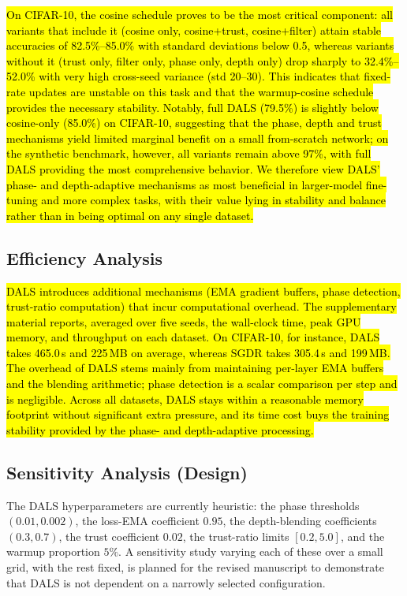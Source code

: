 \documentclass[a4paper,fleqn]{cas-dc}
\begin{document}
\hl{On CIFAR-10, the cosine schedule proves to be the most critical component: all variants that include it (cosine only, cosine+trust, cosine+filter) attain stable accuracies of 82.5\%--85.0\% with standard deviations below 0.5, whereas variants without it (trust only, filter only, phase only, depth only) drop sharply to 32.4\%--52.0\% with very high cross-seed variance (std 20--30). This indicates that fixed-rate updates are unstable on this task and that the warmup-cosine schedule provides the necessary stability. Notably, full DALS (79.5\%) is slightly below cosine-only (85.0\%) on CIFAR-10, suggesting that the phase, depth and trust mechanisms yield limited marginal benefit on a small from-scratch network; on the synthetic benchmark, however, all variants remain above 97\%, with full DALS providing the most comprehensive behavior. We therefore view DALS' phase- and depth-adaptive mechanisms as most beneficial in larger-model fine-tuning and more complex tasks, with their value lying in stability and balance rather than in being optimal on any single dataset.}

\subsection{Efficiency Analysis}\label{sec:efficiency}

\hl{DALS introduces additional mechanisms (EMA gradient buffers, phase detection, trust-ratio computation) that incur computational overhead. The supplementary material reports, averaged over five seeds, the wall-clock time, peak GPU memory, and throughput on each dataset. On CIFAR-10, for instance, DALS takes 465.0\,s and 225\,MB on average, whereas SGDR takes 305.4\,s and 199\,MB. The overhead of DALS stems mainly from maintaining per-layer EMA buffers and the blending arithmetic; phase detection is a scalar comparison per step and is negligible. Across all datasets, DALS stays within a reasonable memory footprint without significant extra pressure, and its time cost buys the training stability provided by the phase- and depth-adaptive processing.}

\subsection{Sensitivity Analysis (Design)}\label{sec:sensitivity}

The DALS hyperparameters are currently heuristic: the phase thresholds $(0.01,0.002)$, the loss-EMA coefficient $0.95$, the depth-blending coefficients $(0.3,0.7)$, the trust coefficient $0.02$, the trust-ratio limits $[0.2,5.0]$, and the warmup proportion $5\%$. A sensitivity study varying each of these over a small grid, with the rest fixed, is planned for the revised manuscript to demonstrate that DALS is not dependent on a narrowly selected configuration.
\end{document}

